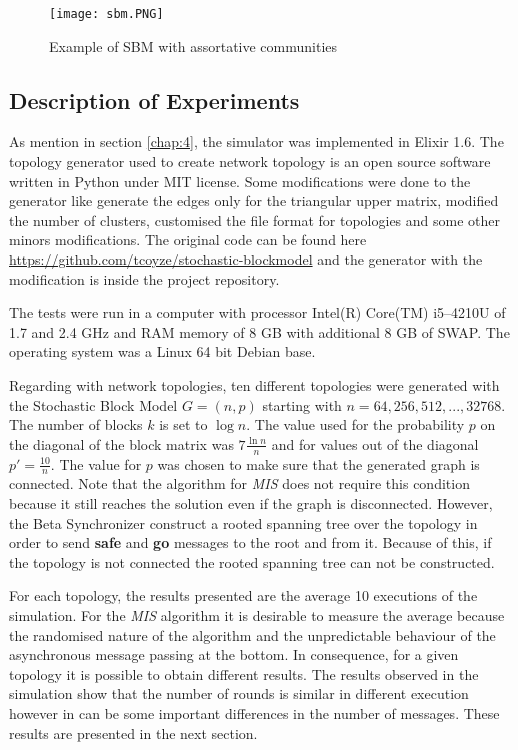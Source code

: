 \begin{figure}[ht]
\centering
\texttt{[image: sbm.PNG]} 
\caption{Example of SBM with assortative communities}
\label{fig:sbm}
\end{figure}

\subsection{Description of Experiments}

As mention in section \ref{chap:4}, the simulator was implemented in Elixir 1.6. The topology generator used to create network topology is an open source software written in Python under MIT license. Some modifications were done to the generator like generate the edges only for the triangular upper matrix, modified the number of clusters, customised the file format for topologies and some other minors modifications. The original code can be found here \url{https://github.com/tcoyze/stochastic-blockmodel} and the generator with the modification is inside the project repository.


The tests were run in a computer with processor Intel(R) Core(TM) i5--4210U of 1.7 and 2.4 GHz and RAM memory of 8 GB with additional 8 GB of SWAP. The operating system was a Linux 64 bit Debian base.

Regarding with network topologies, ten different topologies were generated with the Stochastic Block Model $G = (n,p)$ starting with $n=64,256,512,...,32768$. The number of blocks $k$ is set to $\log n$. The value used for the probability $p$ on the diagonal of the block matrix was $7{\tfrac {\ln n}{n}}$  and for values out of the diagonal $p\prime = {\tfrac {10}{n}}$. The value for $p$ was chosen to make sure that the generated graph is connected. Note that the algorithm for \textit{MIS} does not require this condition because it still reaches the solution even if the graph is disconnected. However, the Beta Synchronizer construct a rooted spanning tree over the topology in order to send \textbf{safe} and \textbf{go} messages to the root and from it. Because of this, if the topology is not connected the rooted spanning tree can not be constructed.


For each topology, the results presented are the average 10 executions of the simulation. For the \textit{MIS } algorithm it is desirable to measure the average because the randomised nature of the algorithm and the unpredictable behaviour of the asynchronous message passing at the bottom. In consequence, for a given topology it is possible to obtain different results. The results observed in the simulation show that the number of rounds is similar in different execution however in can be some important differences in the number of messages. These results are presented in the next section.

